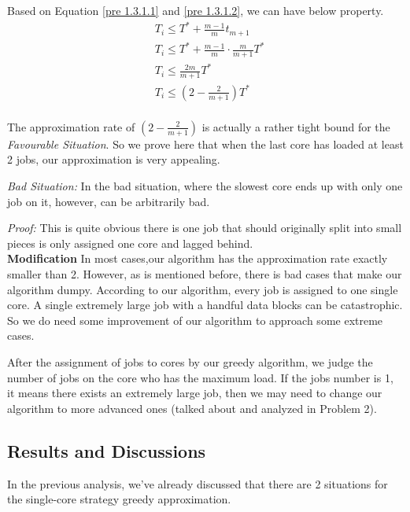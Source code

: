 \documentclass{article}
\begin{document}
    Based on Equation \ref{pre 1.3.1.1} and \ref{pre 1.3.1.2}, we can have below property.
    \begin{equation}
        \begin{aligned}
            &T_i \leq T^* +  \frac{m-1}{m} t_{m+1}\\
            &T_i \leq T^* +  \frac{m-1}{m} \cdot \frac{m}{m+1} T^*\\
            &T_i \leq  \frac{2m}{m+1} T^*\\
            &T_i \leq  (2-\frac{2}{m+1}) T^*\\
        \end{aligned}
        \label{approx1}
    \end{equation}
    
    The approximation rate of $(2-\frac{2}{m+1})$ is actually a rather tight bound for the \textit{Favourable Situation}. So we prove here that when the last core has loaded at least 2 jobs, our approximation is very appealing.
    
    
    \textit{Bad Situation:} In the bad situation, where the slowest core ends up with only one job on it, however, can be arbitrarily bad. 
    
    \textit{Proof:} This is quite obvious there is one job that should originally split into small pieces is only assigned one core and lagged behind.\\
    
    \textbf{Modification} In most cases,our algorithm has the approximation rate exactly smaller than 2. However, as is mentioned before, there is bad cases that make our algorithm dumpy. According to our algorithm, every job is assigned to one single core. A single extremely large job with a handful data blocks can be catastrophic. So we do need some improvement of our algorithm to approach some extreme cases.
    
    After the assignment of jobs to cores by our greedy algorithm, we judge the number of jobs on the core who has the maximum load. If the jobs number is 1, it means there exists an extremely large job, then we may need to change our algorithm to more advanced ones (talked about and analyzed in Problem 2). 
    
\subsection{Results and Discussions}
    \label{simplified analysis}
    In the previous analysis, we've already discussed that there are 2 situations for the single-core strategy greedy approximation.
    
\end{document}

